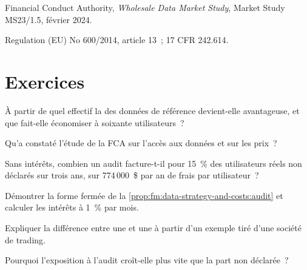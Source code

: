 \begin{omsources}
\item Financial Conduct Authority, \emph{Wholesale Data Market Study}, Market Study MS23/1.5, février 2024.
\item Regulation (EU) No 600/2014, article 13~; 17 CFR 242.614.
\end{omsources}

\section{Exercices}

\begin{exercise}[$\star$]\label{exo:fm:data-strategy-and-costs:1}
À partir de quel effectif la  des données de référence devient-elle avantageuse, et que fait-elle économiser à soixante utilisateurs~?
\end{exercise}

\begin{exercise}[$\star$]\label{exo:fm:data-strategy-and-costs:2}
Qu'a constaté l'étude de la FCA sur l'accès aux données et sur les prix~?
\end{exercise}

\begin{exercise}[$\star$]\label{exo:fm:data-strategy-and-costs:3}
Sans intérêts, combien un audit facture-t-il pour 15~\% des utilisateurs réels non déclarés sur trois ans, sur 774\,000~\$ par an de frais par utilisateur~?
\end{exercise}

\begin{exercise}[$\star\star$]\label{exo:fm:data-strategy-and-costs:4}
Démontrer la forme fermée de la \cref{prop:fm:data-strategy-and-costs:audit} et calculer les intérêts à 1~\% par mois.
\end{exercise}

\begin{exercise}[$\star\star$]\label{exo:fm:data-strategy-and-costs:5}
Expliquer la différence entre une  et une  à partir d'un exemple tiré d'une société de trading.
\end{exercise}

\begin{exercise}[$\star\star$]\label{exo:fm:data-strategy-and-costs:6}
Pourquoi l'exposition à l'audit croît-elle plus vite que la part non déclarée~?
\end{exercise}

